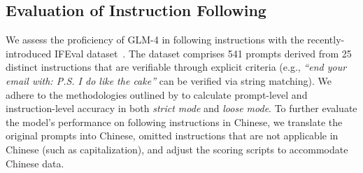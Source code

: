  
\begin{table}[!ht]
    \centering
    \renewcommand{\arraystretch}{1.5}
    \caption{GLM-4 performance on academic benchmarks.}
    \label{tab:academic}
\end{table}




\subsection{Evaluation of Instruction Following}

We assess the proficiency of GLM-4 in following instructions with the recently-introduced IFEval dataset~\cite{zhou2023instruction}.
The dataset comprises 541 prompts derived from 25 distinct instructions that are verifiable through explicit criteria (e.g., \emph{``end your email with: P.S. I do like the cake''} can be verified via string matching).
We adhere to the methodologies outlined by \cite{zhou2023instruction} to calculate prompt-level and instruction-level accuracy in both \emph{strict mode} and \emph{loose mode}.
To further evaluate the model’s performance on following instructions in Chinese, we translate the original prompts into Chinese, omitted instructions that are not applicable in Chinese (such as capitalization), and adjust the scoring scripts to accommodate Chinese data.

